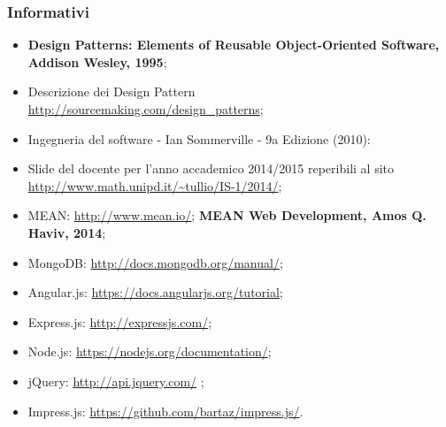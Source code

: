 \subsubsection{Informativi}
\begin{itemize}
\item \textbf{Design Patterns: Elements of Reusable Object-Oriented Software, Addison Wesley, 1995};
\item Descrizione dei Design Pattern\\
\url{http://sourcemaking.com/design_patterns};
\item Ingegneria del software - Ian Sommerville - 9a Edizione (2010):
\item Slide del docente per l'anno accademico 2014/2015 reperibili al sito \\
\url{http://www.math.unipd.it/~tullio/IS-1/2014/};
\item MEAN: \url{http://www.mean.io/}; \textbf{MEAN Web Development, Amos Q. Haviv, 2014}; 
\item MongoDB: \url{http://docs.mongodb.org/manual/};
\item Angular.js: \url{https://docs.angularjs.org/tutorial};
\item Express.js: \url{http://expressjs.com/};
\item Node.js: \url{https://nodejs.org/documentation/};
\item jQuery: \url{http://api.jquery.com/} ;
\item Impress.js: \url{https://github.com/bartaz/impress.js/}.

\end{itemize}
